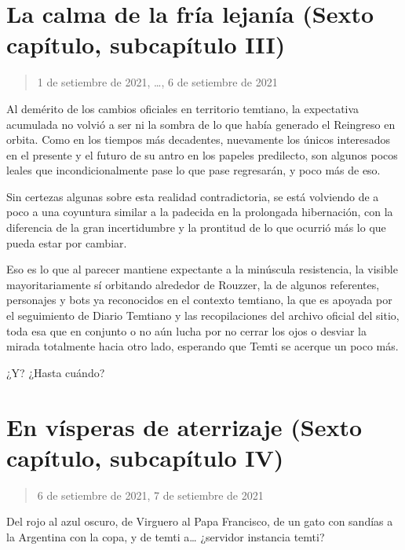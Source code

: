 \documentclass[
  spanish,
]{book}
\begin{document}
\hypertarget{la-calma-de-la-fruxeda-lejanuxeda-sexto-capuxedtulo-subcapuxedtulo-iii}{%
\section{La calma de la fría lejanía (Sexto capítulo, subcapítulo III)}\label{la-calma-de-la-fruxeda-lejanuxeda-sexto-capuxedtulo-subcapuxedtulo-iii}}

\begin{quote}
1 de setiembre de 2021, \ldots, 6 de setiembre de 2021
\end{quote}

Al demérito de los cambios oficiales en territorio temtiano, la expectativa acumulada no volvió a ser ni la sombra de lo que había generado el Reingreso en orbita.
Como en los tiempos más decadentes, nuevamente los únicos interesados en el presente y el futuro de su antro en los papeles predilecto, son algunos pocos leales que incondicionalmente pase lo que pase regresarán, y poco más de eso.

Sin certezas algunas sobre esta realidad contradictoria, se está volviendo de a poco a una coyuntura similar a la padecida en la prolongada hibernación, con la diferencia de la gran incertidumbre y la prontitud de lo que ocurrió más lo que pueda estar por cambiar.

Eso es lo que al parecer mantiene expectante a la minúscula resistencia, la visible mayoritariamente sí orbitando alrededor de Rouzzer, la de algunos referentes, personajes y bots ya reconocidos en el contexto temtiano, la que es apoyada por el seguimiento de Diario Temtiano y las recopilaciones del archivo oficial del sitio, toda esa que en conjunto o no aún lucha por no cerrar los ojos o desviar la mirada totalmente hacia otro lado, esperando que Temti se acerque un poco más.

¿Y?
¿Hasta cuándo?

\hypertarget{en-vuxedsperas-de-aterrizaje-sexto-capuxedtulo-subcapuxedtulo-iv}{%
\section{En vísperas de aterrizaje (Sexto capítulo, subcapítulo IV)}\label{en-vuxedsperas-de-aterrizaje-sexto-capuxedtulo-subcapuxedtulo-iv}}

\begin{quote}
6 de setiembre de 2021, 7 de setiembre de 2021
\end{quote}

Del rojo al azul oscuro, de Virguero al Papa Francisco, de un gato con sandías a la Argentina con la copa, y de temti a\ldots{} ¿servidor instancia temti?
\end{document}
